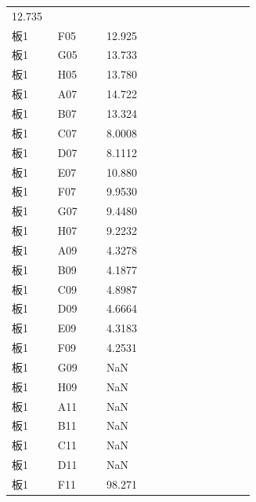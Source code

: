 \documentclass[UTF8,10pt,a4paper,fontset=fandol]{ctexart}
\newcommand{\fieldvalue}[1]{#1}
\begin{document}
\begin{tabular}{@{}p{0.17\linewidth}p{0.18\linewidth}p{0.55\linewidth}@{}}
\fieldvalue{12.735}
\\
板1 & F05 &
\fieldvalue{12.925}
\\
板1 & G05 &
\fieldvalue{13.733}
\\
板1 & H05 &
\fieldvalue{13.780}
\\
板1 & A07 &
\fieldvalue{14.722}
\\
板1 & B07 &
\fieldvalue{13.324}
\\
板1 & C07 &
\fieldvalue{8.0008}
\\
板1 & D07 &
\fieldvalue{8.1112}
\\
板1 & E07 &
\fieldvalue{10.880}
\\
板1 & F07 &
\fieldvalue{9.9530}
\\
板1 & G07 &
\fieldvalue{9.4480}
\\
板1 & H07 &
\fieldvalue{9.2232}
\\
板1 & A09 &
\fieldvalue{4.3278}
\\
板1 & B09 &
\fieldvalue{4.1877}
\\
板1 & C09 &
\fieldvalue{4.8987}
\\
板1 & D09 &
\fieldvalue{4.6664}
\\
板1 & E09 &
\fieldvalue{4.3183}
\\
板1 & F09 &
\fieldvalue{4.2531}
\\
板1 & G09 &
\fieldvalue{NaN}
\\
板1 & H09 &
\fieldvalue{NaN}
\\
板1 & A11 &
\fieldvalue{NaN}
\\
板1 & B11 &
\fieldvalue{NaN}
\\
板1 & C11 &
\fieldvalue{NaN}
\\
板1 & D11 &
\fieldvalue{NaN}
\\
板1 & F11 &
\fieldvalue{98.271}
\end{tabular}
\end{document}
